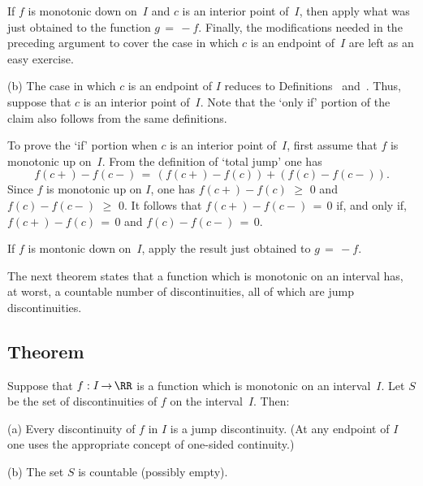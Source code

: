         If $f$ is monotonic down on~$I$ and $c$ is an interior point of~$I$, then apply what was just obtained to the function $g \,=\, -f$.
    Finally, the modifications needed in the preceding argument to cover the case in which $c$ is an endpoint of~$I$ are left as an easy exercise. %

\V

        (b) The case in which $c$ is an endpoint of $I$ reduces to Definitions~ and~.
    Thus, suppose that $c$ is an interior point of~$I$. Note that the `only if' portion of the claim also follows from the same definitions.

    To prove the `if' portion when $c$ is an interior point of~$I$, first assume that $f$ is monotonic up on~$I$.
    From the definition of `total jump' one has
        \begin{displaymath}
        f(c+) - f(c-) \,=\, (f(c+) - f(c)) + (f(c)-f(c-)).
        \end{displaymath}
    Since $f$ is monotonic up on $I$, one has $f(c+)-f(c)\,\,{\geq}\,\,0$ and $f(c)-f(c-)\,\,{\geq}\,\,0$.
    It follows that $f(c+) - f(c-) \,=\, 0$ if, and only if, $f(c+)-f(c) \,=\, 0$ and $f(c)-f(c-) \,=\, 0$.

        If $f$ is montonic down on~$I$, apply the result just obtained to $g \,=\, -f$.

\VV

        The next theorem states that a function which is monotonic on an interval has, at worst,
    a countable number of discontinuities, all of which are jump discontinuities.

\VV

            \subsection{\small{\bf Theorem}}
            \label{ThmD50.60}

\VV

        Suppose that $f:I \,{\rightarrow}\, {\RR}$ is a function which is monotonic on an interval~$I$.
    Let $S$ be the set of discontinuities of $f$ on the interval~$I$. Then:

\V

        (a) Every discontinuity of $f$ in $I$ is a jump discontinuity.
    (At any endpoint of $I$ one uses the appropriate concept of one-sided continuity.)

\V

        (b) The set $S$ is countable (possibly empty).

